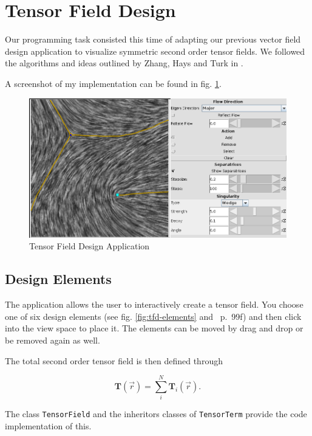 \documentclass[a4paper,10pt,notitlepage]{scrartcl}
\newcommand{\mat}[1]{\mathbf{#1}}
\begin{document}
\section{Tensor Field Design}

Our programming task consisted this time of adapting our previous vector field
design application to visualize symmetric second order tensor fields. We
followed the algorithms and ideas outlined by Zhang, Hays and Turk in
\cite{tfd}.

A screenshot of my implementation can be found in fig. \ref{fig:tfd-app}.

\begin{figure}
 \centering
 \includegraphics[scale=0.5]{img-4-2/app.png}
 \caption{Tensor Field Design Application}
 \label{fig:tfd-app}
\end{figure}

\subsection{Design Elements}

The application allows the user to interactively create a tensor field. You
choose one of six design elements (see fig. \ref{fig:tfd-elements} and
\cite{tfd}~p.~99f) and then click into the view space to place it. The
elements can be moved by drag and drop or be removed again as well.

The total second order tensor field is then defined through

\begin{equation}
 \mat{T}(\vec{r}) = \sum_i^N \mat{T}_i(\vec{r}).
 \label{eq:tf}
\end{equation}

The class \texttt{TensorField} and the inheritors classes of
\texttt{TensorTerm} provide the code implementation of this.
\end{document}

